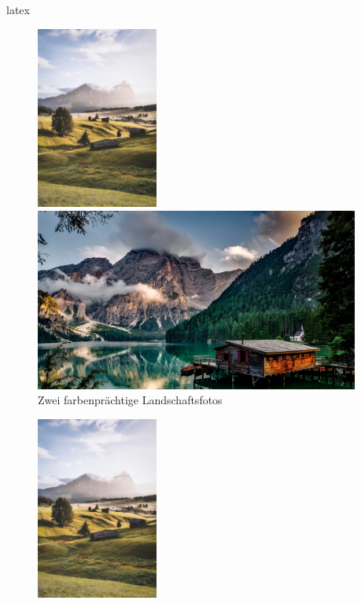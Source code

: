 \begin{showcase}
    \begin{code}{latex}
        \begin{figure}[H]
            \begin{minipage}[c]{0.27\columnwidth}
                \includegraphics[width=\linewidth,height=6cm,keepaspectratio]{assets/images/bilder/pexels-eberhard-grossgasteiger-2437291.jpg}
            \end{minipage}
            \hfill
            \begin{minipage}[c]{0.72\columnwidth}
                \includegraphics[width=\linewidth,height=6cm,keepaspectratio]{assets/images/bilder/pexels-pixabay-147411.jpg}
            \end{minipage}
            \caption{Zwei farbenprächtige Landschaftsfotos}
        \end{figure}
    \end{code}
    \tcblower
    \begin{center}
        \captionsetup{type=figure}
        \begin{subfigure}{0.27\columnwidth}
            \includegraphics[width=\linewidth,height=6cm,keepaspectratio]{assets/images/bilder/pexels-eberhard-grossgasteiger-2437291.jpg}

\end{subfigure}
\end{center}
\end{showcase}
